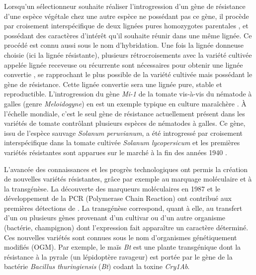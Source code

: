 	Lorsqu’un sélectionneur souhaite réaliser l'introgression d'un gène de résistance d'une espèce végétale chez une autre espèce ne possédant pas ce gène, il procède  par croisement  interspécifique
de  deux lignées pures homozygotes  parentales  \citep{Shull1908}, et possédant des caractères d’intérêt qu’il souhaite réunir dans une même lignée. Ce procédé est connu aussi sous le nom d'hybridation. Une fois la lignée \og donneuse \fg{} choisie (ici la lignée résistante), plusieurs rétrocroisements avec la variété cultivée  appelée lignée \og receveuse ou récurrente \fg{} sont  nécessaires pour obtenir une \og  lignée convertie \fg, se rapprochant le plus possible de la variété cultivée mais possédant le gène de résistance.
Cette lignée convertie  sera une lignée pure, stable et reproductible.
L'introgression  du gène \textit{Mi-1} de la tomate vis-à-vis du nématode à galles (genre \textit{Meloidogyne})  en est un exemple typique en culture maraîchère \citep{Milligan1998}. À l'échelle mondiale, c’est le seul gène de résistance actuellement présent dans les variétés de tomate contrôlant plusieurs espèces de nématodes à galles. Ce gène, issu de l’espèce sauvage \textit{Solanum peruvianum}, a été introgressé par croisement interspécifique dans la tomate cultivée \textit{Solanum lycopersicum} et les premières variétés résistantes sont apparues sur le marché à la fin des années 1940 \citep{Smith1944}.



	L'avancée des connaissances et les progrès technologiques ont permis  la création de nouvelles variétés résistantes, grâce par exemple  au marquage moléculaire et à la transgénèse. %
La découverte des marqueurs moléculaires en 1987 et le développement de la PCR (Polymerase Chain Reaction) ont contribué aux premières détections de . 
La transgénèse correspond, quant à elle, au transfert d'un ou plusieurs gènes provenant d'un cultivar ou d'un autre organisme (bactérie, champignon)  dont l'expression  fait apparaître un caractère  déterminé.  Ces nouvelles variétés sont connues sous le nom d'organismes génétiquement modifiés (OGM). Par exemple,  le maïs \textit{Bt} est une plante transgénique dont la résistance à la pyrale  (un lépidoptère ravageur) est portée par le gène de la bactérie  \textit{Bacillus thuringiensis} (\textit{Bt}) codant la toxine \textit{Cry1Ab}. %

